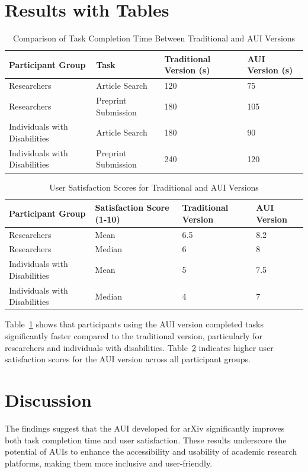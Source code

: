 \documentclass{article}
\begin{document}
\section{Results with Tables}
\begin{table}[ht]
\centering
\caption{Comparison of Task Completion Time Between Traditional and AUI Versions}
\label{tab:task_completion}
\begin{tabular}{@{}llll@{}}
\toprule
\textbf{Participant Group} & \textbf{Task} & \textbf{Traditional Version (s)} & \textbf{AUI Version (s)} \\ \midrule
Researchers & Article Search & 120 & 75 \\
Researchers & Preprint Submission & 180 & 105 \\
Individuals with Disabilities & Article Search & 180 & 90 \\
Individuals with Disabilities & Preprint Submission & 240 & 120 \\ \bottomrule
\end{tabular}
\end{table}

\begin{table}[ht]
\centering
\caption{User Satisfaction Scores for Traditional and AUI Versions}
\label{tab:user_satisfaction}
\begin{tabular}{@{}llll@{}}
\toprule
\textbf{Participant Group} & \textbf{Satisfaction Score (1-10)} & \textbf{Traditional Version} & \textbf{AUI Version} \\ \midrule
Researchers & Mean & 6.5 & 8.2 \\
Researchers & Median & 6 & 8 \\
Individuals with Disabilities & Mean & 5 & 7.5 \\
Individuals with Disabilities & Median & 4 & 7 \\ \bottomrule
\end{tabular}
\end{table}

Table~\ref{tab:task_completion} shows that participants using the AUI version completed tasks significantly faster compared to the traditional version, particularly for researchers and individuals with disabilities. Table~\ref{tab:user_satisfaction} indicates higher user satisfaction scores for the AUI version across all participant groups.

\section{Discussion}
The findings suggest that the AUI developed for arXiv significantly improves both task completion time and user satisfaction. These results underscore the potential of AUIs to enhance the accessibility and usability of academic research platforms, making them more inclusive and user-friendly.
\end{document}
